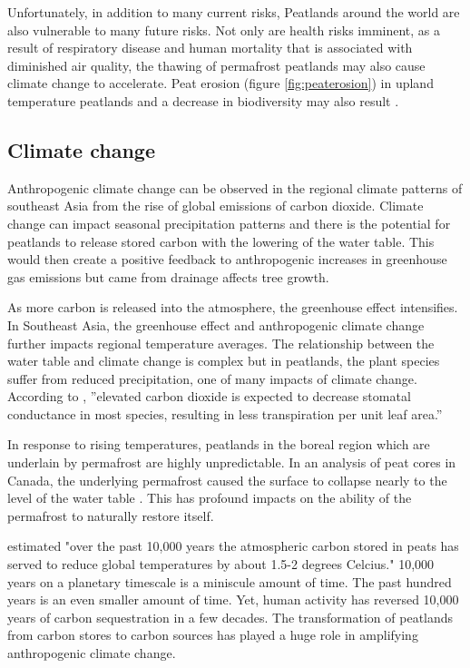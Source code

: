 Unfortunately, in addition to many current risks, Peatlands around the world are also vulnerable to many future risks. Not only are health risks imminent, as a result of respiratory disease and human mortality that is associated with diminished air quality, the thawing of permafrost peatlands may also cause climate change to accelerate. Peat erosion (figure \ref{fig:peaterosion}) in upland temperature peatlands and a decrease in biodiversity may also result \citep{turetsky2015global}. 

\subsection{Climate change}

Anthropogenic climate change can be observed in the regional climate patterns of southeast Asia from the rise of global emissions of carbon dioxide. Climate change can impact seasonal precipitation patterns and there is the potential for peatlands to release stored carbon with the lowering of the water table. This would then create a positive feedback to anthropogenic increases in greenhouse gas emissions but came from drainage affects tree growth. 

As more carbon is released into the atmosphere, the greenhouse effect intensifies. In Southeast Asia, the greenhouse effect and anthropogenic climate change further impacts regional temperature averages. The relationship between the water table and climate change is complex but in peatlands, the plant species suffer from reduced precipitation, one of many impacts of climate change. According to \citet{ahmad2009global}, ''elevated carbon dioxide is expected to decrease stomatal conductance in most species, resulting in less transpiration per unit leaf area.''

In response to rising temperatures, peatlands in the boreal region which are underlain by permafrost are highly unpredictable. In an analysis of peat cores in Canada, the underlying permafrost caused the surface to collapse nearly to the level of the water table \citep{dise2009peatland}. This has profound impacts on the ability of the permafrost to naturally restore itself. 

\citet{holden2005peatland} estimated "over the past 10,000 years the atmospheric carbon stored in peats has served to reduce global temperatures by about 1.5-2 degrees Celcius." 10,000 years on a planetary timescale is a miniscule amount of time. The past hundred years is an even smaller amount of time. Yet, human activity has reversed 10,000 years of carbon sequestration in a few decades. The transformation of peatlands from carbon stores to carbon sources has played a huge role in amplifying anthropogenic climate change. 

